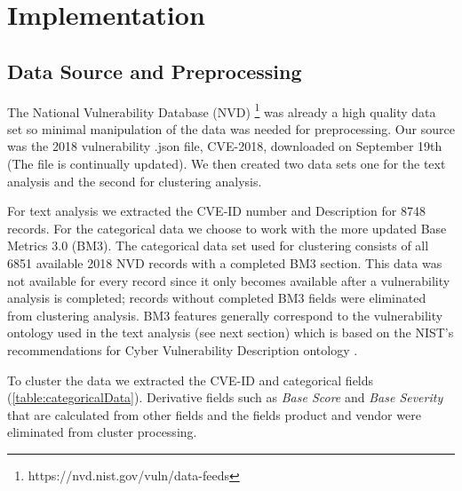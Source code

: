 \documentclass{article} %
\begin{document}
\section{Implementation}
\subsection{Data Source and Preprocessing}



The National Vulnerability Database (NVD) \footnote{https://nvd.nist.gov/vuln/data-feeds} was already a high quality data set so minimal manipulation of the data was needed for preprocessing. Our source was the 2018 vulnerability .json file, CVE-2018, downloaded on September 19th (The file is continually updated). We then created two data sets one for the text analysis and the second for clustering analysis.  

For text analysis we extracted the CVE-ID number and Description for 8748 records.  For the categorical data we choose to work with the more updated Base Metrics 3.0 (BM3). The categorical data set used for clustering consists of all 6851 available 2018 NVD records with a completed BM3 section.  This data was not available for every record since it only becomes available after a vulnerability analysis is completed; records without completed BM3 fields were eliminated from clustering analysis.  BM3 features generally correspond to the vulnerability ontology used in the text analysis (see next section) which is based on the NIST's recommendations for Cyber Vulnerability Description ontology \cite{Booth2016DraftOntology}.

To cluster the data we extracted the CVE-ID and categorical fields (\ref{table:categoricalData}).  Derivative fields such as \textit{Base Score} and \textit{Base Severity} that are calculated from other fields and the fields product and vendor were eliminated from cluster processing.    
\end{document}
